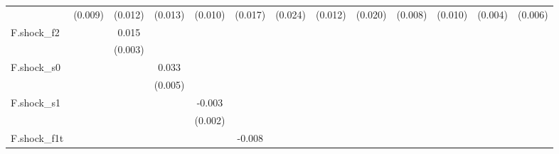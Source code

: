 {\begin{tabular}{l*{12}{c}}
            &     (0.009)         &     (0.012)         &     (0.013)         &     (0.010)         &     (0.017)         &     (0.024)         &     (0.012)         &     (0.020)         &     (0.008)         &     (0.010)         &     (0.004)         &     (0.006)         \\
\addlinespace
F.shock\_f2  &                     &       0.015\sym{***}&                     &                     &                     &                     &                     &                     &                     &                     &                     &                     \\
            &                     &     (0.003)         &                     &                     &                     &                     &                     &                     &                     &                     &                     &                     \\
\addlinespace
F.shock\_s0  &                     &                     &       0.033\sym{***}&                     &                     &                     &                     &                     &                     &                     &                     &                     \\
            &                     &                     &     (0.005)         &                     &                     &                     &                     &                     &                     &                     &                     &                     \\
\addlinespace
F.shock\_s1  &                     &                     &                     &      -0.003\sym{*}  &                     &                     &                     &                     &                     &                     &                     &                     \\
            &                     &                     &                     &     (0.002)         &                     &                     &                     &                     &                     &                     &                     &                     \\
\addlinespace
F.shock\_f1t &                     &                     &                     &                     &      -0.008         &                     &                     &                     &                     &                     &                     &                     \\

\end{tabular}}
